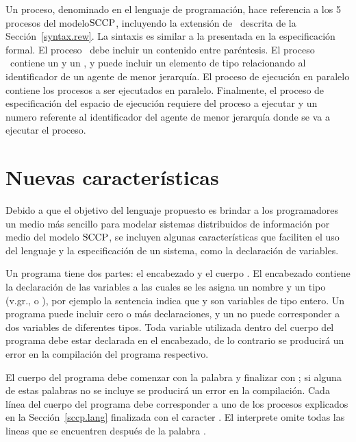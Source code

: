 Un proceso, denominado  en el lenguaje de programaci\'on, hace referencia a los 5 procesos del modelo$\textnormal{SCCP}$, incluyendo la extensi\'on de \ask \ descrita de la Secci\'on~\ref{syntax.rew}. La sintaxis es similar a la presentada en la especificaci\'on formal. El proceso \tell \ debe incluir un  contenido entre par\'entesis. El proceso \ask \ contiene un  y un , y puede incluir un elemento de tipo  relacionando al identificador de un agente de menor jerarqu\'ia. El proceso de ejecuci\'on en paralelo contiene los procesos a ser ejecutados en paralelo. Finalmente, el proceso de especificaci\'on del espacio de ejecuci\'on requiere del proceso a ejecutar  y un numero  referente al identificador del agente de menor jerarqu\'ia donde se va a ejecutar el proceso.

\section{Nuevas caracter\'isticas}
\label{new.lang}   

Debido a que el objetivo del lenguaje propuesto es brindar a los programadores un medio m\'as sencillo para modelar sistemas distribuidos de informaci\'on por medio del modelo $\textnormal{SCCP}$, se incluyen algunas caracter\'isticas que faciliten el uso del lenguaje y la especificaci\'on de un sistema, como la declaraci\'on de variables.

Un programa  tiene dos partes: el encabezado  y el cuerpo . El encabezado contiene la declaraci\'on de las variables a las cuales se les asigna un nombre  y un tipo (v.gr.,  o ), por ejemplo la sentencia  indica que  y  son variables de tipo entero. Un programa puede incluir cero o m\'as declaraciones, y un  no puede corresponder a dos variables de diferentes tipos. Toda variable utilizada dentro del cuerpo del programa debe estar declarada en el encabezado, de lo contrario se producir\'a un error en la compilaci\'on del programa respectivo.  

El cuerpo del programa debe comenzar con la palabra  y finalizar con ; si alguna de estas palabras no se incluye se producir\'a un error en la compilaci\'on. Cada l\'inea del cuerpo del programa debe corresponder a uno de los procesos explicados en la Secci\'on~\ref{sccp.lang} finalizada con el caracter . El interprete omite todas las lineas que se encuentren despu\'es de la palabra .

